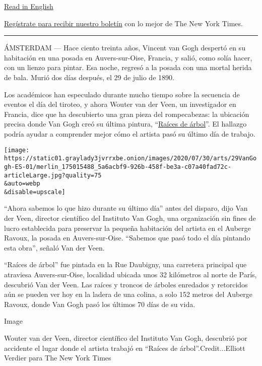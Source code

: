 \href{https://www.nytimes3xbfgragh.onion/2020/07/28/arts/design/vincent-van-gogh-tree-roots.html}{Read
in English}

\href{https://www.nytimes3xbfgragh.onion/newsletters/el-times}{Regístrate
para recibir nuestro boletín} con lo mejor de The New York Times.

\begin{center}\rule{0.5\linewidth}{\linethickness}\end{center}

ÁMSTERDAM --- Hace ciento treinta años, Vincent van Gogh despertó en su
habitación en una posada en Auvers-sur-Oise, Francia, y salió, como
solía hacer, con un lienzo para pintar. Esa noche, regresó a la posada
con una mortal herida de bala. Murió dos días después, el 29 de julio de
1890.

Los académicos han especulado durante mucho tiempo sobre la secuencia de
eventos el día del tiroteo, y ahora Wouter van der Veen, un investigador
en Francia, dice que ha descubierto una gran pieza del rompecabezas: la
ubicación precisa donde Van Gogh creó su última pintura,
``\href{https://www.vangoghmuseum.nl/en/collection/s0195V1962}{Raíces de
árbol}''. El hallazgo podría ayudar a comprender mejor cómo el artista
pasó su último día de trabajo.

\texttt{[image: https://static01.graylady3jvrrxbe.onion/images/2020/07/30/arts/29VanGogh-ES-01/merlin\_175015488\_5a6acbf9-926b-458f-be3a-c07a40fad72c-articleLarge.jpg?quality=75\\\&auto=webp\\\&disable=upscale]}

``Ahora sabemos lo que hizo durante su último día'' antes del disparo,
dijo Van der Veen, director científico del Instituto Van Gogh, una
organización sin fines de lucro establecida para preservar la pequeña
habitación del artista en el Auberge Ravoux, la posada en
Auvers-sur-Oise. ``Sabemos que pasó todo el día pintando esta obra'',
señaló Van der Veen.

``Raíces de árbol'' fue pintada en la Rue Daubigny, una carretera
principal que atraviesa Auvers-sur-Oise, localidad ubicada unos 32
kilómetros al norte de París, descubrió Van der Veen. Las raíces y
troncos de árboles enredados y retorcidos aún se pueden ver hoy en la
ladera de una colina, a solo 152 metros del Auberge Ravoux, donde Van
Gogh pasó los últimos 70 días de su vida.

Image

Wouter van der Veen, director científico del Instituto Van Gogh,
descubrió por accidente el lugar donde el artista trabajó en ``Raíces de
árbol''.Credit...Elliott Verdier para The New York Times

